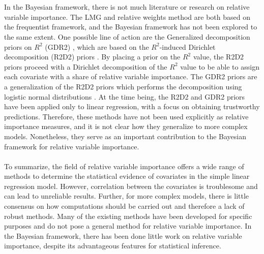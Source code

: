 \\
\\
In the Bayesian framework, there is not much literature or research on relative variable importance. The LMG and relative weights method are both based on the frequentist framework, and the Bayesian framework has not been explored to the same extent. One possible line of action are the Generalized decomposition priors on $R^2$ (GDR2) \citep{aguilar2024generalized}, which are based on the $R^2$-induced Dirichlet decomposition (R2D2) priors \citep{zhang2020bayesian}. By placing a prior on the $R^2$ value, the R2D2 priors proceed with a Dirichlet decomposition of the $R^2$ value to be able to assign each covariate with a share of relative variable importance. The GDR2 priors are a generalization of the R2D2 priors which performs the decomposition using logistic normal distributions \citep{aguilar2024generalized}. At the time being, the R2D2 and GDR2 priors have been applied only to linear regression, with a focus on obtaining trustworthy predictions. Therefore, these methods have not been used explicitly as relative importance measures, and it is not clear how they generalize to more complex models. Nonetheless, they serve as an important contribution to the Bayesian framework for relative variable importance.
\\
\\
To summarize, the field of relative variable importance offers a wide range of methods to determine the statistical evidence of covariates in the simple linear regression model. However, correlation between the covariates is troublesome and can lead to unreliable results. Further, for more complex models, there is little consensus on how computations should be carried out and therefore a lack of robust methods. Many of the existing methods have been developed for specific purposes and do not pose a general method for relative variable importance. In the Bayesian framework, there has been done little work on relative variable importance, despite its advantageous features for statistical inference.
\\
\\
